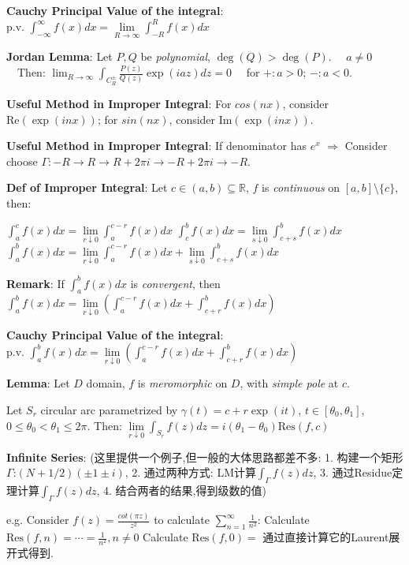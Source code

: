 \documentclass[9pt]{article}
\begin{document}
\quad \textbf{Cauchy Principal Value of the integral}: $\text{p.v. }\int_{-\infty}^{\infty}f(x)dx=\lim\limits_{R\to\infty}\int_{-R}^{R}f(x)dx$

\textbf{Jordan Lemma}: {\small Let $P,Q$ be \textit{polynomial}, $\deg(Q)>\deg(P)$. \ \ $a\ne 0$} \ \ Then: $\lim_{R\to\infty}\int_{C_R^{\pm}} \frac{P(z)}{Q(z)}\exp(iaz)dz=0$ \ \ for $+:a>0$; $-:a<0$.

\textbf{Useful Method in Improper Integral}: {\footnotesize For $cos(nx)$, consider $\text{Re}(\exp(inx))$; \quad for $sin(nx)$, consider $\text{Im}(\exp(inx))$.} 

\textbf{Useful Method in Improper Integral}: {\footnotesize If denominator has $e^x$ $\Rightarrow$ Consider choose $\Gamma:-R\to R\to R+2\pi i\to -R+2\pi i\to -R$.} 

\textbf{Def of Improper Integral}: Let $c\in(a,b)\subseteq\mathbb{R}$, $f$ is \textit{continuous} on $[a,b]\setminus\{c\}$, then: 

\qquad $\int_{a}^{c}f(x)dx=\lim\limits_{r\downarrow 0}\int_{a}^{c-r}f(x)dx$ \quad $\int_{c}^{b}f(x)dx=\lim\limits_{s\downarrow 0}\int_{c+s}^{b}f(x)dx$ \quad $\int_{a}^{b}f(x)dx=\lim\limits_{r\downarrow 0}\int_{a}^{c-r}f(x)dx+\lim\limits_{s\downarrow 0}\int_{c+s}^{b}f(x)dx$

\vspace{-3pt}
\quad \textbf{Remark}: If $\int_{a}^{b}f(x)dx$ is \textit{convergent}, then $\int_{a}^{b}f(x)dx=\lim\limits_{r\downarrow0}\left(\int_{a}^{c-r}f(x)dx+\int_{c+r}^{b}f(x)dx\right)$

\quad \textbf{Cauchy Principal Value of the integral}: $\text{p.v. }\int_{a}^{b}f(x)dx=\lim\limits_{r\downarrow0}\left(\int_{a}^{c-r}f(x)dx+\int_{c+r}^{b}f(x)dx\right)$

\textbf{Lemma}: Let $D$ domain, $f$ is \textit{meromorphic} on $D$, with \textit{simple pole} at $c$. 

\quad Let $S_r$ circular arc parametrized by $\gamma(t)=c+r\exp(it)$, $t\in[\theta_0,\theta_1]$, $0\leq\theta_0<\theta_1\leq2\pi$. Then: $\lim\limits_{r\downarrow0}\int_{S_r}f(z)dz=i(\theta_1-\theta_0)\text{Res}(f,c)$

\textbf{Infinite Series}: {\tiny (这里提供一个例子,但一般的大体思路都差不多: 1. 构建一个矩形$\Gamma$:$(N+1/2)(\pm1\pm i)$, 2. 通过两种方式: LM计算$\int_{\Gamma}f(z)dz$, 3. 通过Residue定理计算$\int_{\Gamma}f(z)dz$, 4. 结合两者的结果,得到级数的值)}

{\scriptsize e.g. Consider $f(z)=\frac{cot(\pi z)}{z^2}$ to calculate $\sum_{n=1}^{\infty}\frac{1}{n^2}$: \qquad Calculate $\text{Res}(f,n)=\cdots=\frac{1}{n^2},n\ne0$ \qquad Calculate $\text{Res}(f,0)=$ 通过直接计算它的Laurent展开式得到.}
\end{document}
